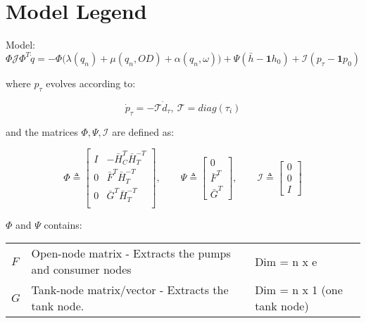 \section{Model Legend}

Model:
\begin{equation*}
	\Phi\mathcal{J}\Phi^T \dot{q} = -\Phi\Big(\lambda(q_n)+\mu(q_n,OD)+\alpha(q_n,\omega)\Big) + \Psi(\bar{h}-\mathbf{1}h_0) + \mathcal{I}(p_{\tau}-\mathbf{1}p_0)
\end{equation*}

where $p_{\tau}$ evolves according to:

\begin{equation*}
	\dot{p}_{\tau} = - \mathcal{T} \dot{d}_{\tau}, \ \mathcal{T} = diag(\tau_i)
\end{equation*}

and the matrices $\Phi, \Psi, \mathcal{I}$ are defined as:

\begin{equation*}
	\Phi \triangleq 
	\begin{bmatrix} 
		I & -\bar{H}_C^T\bar{H}_T^{-T} \\ 0 & \bar{F}^T\bar{H}_T^{-T} \\ 0  & \bar{G}^T\bar{H}_T^{-T} \\ 
	\end{bmatrix}
	, \qquad
	\Psi \triangleq
	\begin{bmatrix}
		0 \\ \bar{F}^T \\ \bar{G}^T
	\end{bmatrix}
	, \qquad
	\mathcal{I} \triangleq
	\begin{bmatrix}
		0 \\ 0 \\ I
	\end{bmatrix}
\end{equation*}

\medskip
\noindent $\Phi$ and $\Psi$ contains:
\begin{center}
	\begin{tabular}{l p{10cm} l}
		$F$ & Open-node matrix - Extracts the pumps and consumer nodes & Dim = n x e \\
		$G$ & Tank-node matrix/vector - Extracts the tank node. & Dim = n x 1 (one tank node) 
	\end{tabular}
\end{center}

